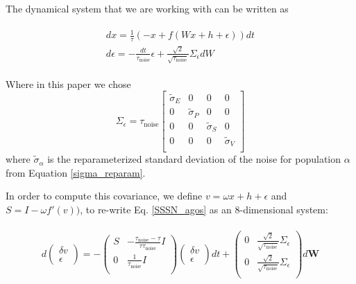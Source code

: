 \documentclass[11pt]{article}
\begin{document}
The dynamical system that we are working with can be written as 

\begin{align}\label{SSSN_agos}
\begin{split}
 dx=\frac{1}{\tau}(-x+f(W x +h+\epsilon)) dt\\
d \epsilon=-\frac{dt}{\tau_{\text{noise}}}\epsilon+\frac{\sqrt{2}}{\sqrt{\tau_{\text{noise}}}}\Sigma_\epsilon dW
\end{split}
\end{align}

Where in this paper we chose 
\begin{equation}
\Sigma_\epsilon=\tau_{\text{noise}} 
\begin{bmatrix} 
\tilde{\sigma}_E & 0 & 0 & 0 \\
0 & \tilde{\sigma}_P & 0 & 0 \\
0 & 0 & \tilde{\sigma}_S & 0 \\
0 & 0 & 0 & \tilde{\sigma}_V \\
\end{bmatrix}
\end{equation}
where $\tilde{\sigma}_\alpha$ is the reparameterized standard deviation of the noise for population $\alpha$ from Equation \ref{sigma_reparam}.

In order to compute this covariance, we define $v=\omega x +h+\epsilon$ and $S=I-\omega f'(v))$, to re-write Eq. \eqref{SSSN_agos} as an 8-dimensional system:

\begin{align}
\begin{split}
d\begin{pmatrix}
\delta v \\
 \epsilon
\end{pmatrix}= -
\begin{pmatrix}
	S &- \frac{\tau_{\text{noise}}-\tau}{\tau \tau_{\text{noise}}}I\\
	 0&\frac{1}{\tau_{\text{noise}}}I\\
\end{pmatrix}
\begin{pmatrix}
	\delta v\\
	\epsilon 
\end{pmatrix} 
dt +
\begin{pmatrix}
	0&\frac{\sqrt{2}}{\sqrt{\tau_{\text{noise}}}} \Sigma_\epsilon\\
	0&\frac{\sqrt{2}}{\sqrt{\tau_{\text{noise}}}} \Sigma_\epsilon \\
\end{pmatrix}    d\mathbf{W} 
\end{split}
\end{align}
\end{document}
